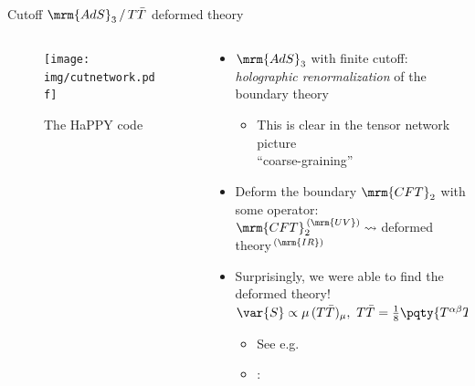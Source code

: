 \documentclass[aspectratio=169,10pt
	,noamsthm
]{beamer}
\begin{document}
\begin{frame}{Cutoff $\mrm{AdS}_3\,/\,T\bar{T}$ deformed theory}{%
	\textcite{McGough:2016lol}%
}
	\begin{columns}
	\begin{column}{.35\textwidth}
		\begin{figure}[!h]
		\centering
		\texttt{[image: img/cutnetwork.pdf]}
		\caption{The HaPPY code \cite{Pastawski:2015qua,Harlow:2018fse}}
		\end{figure}
	\end{column}
	\begin{column}{.65\textwidth}
		\begin{itemize}
		\item $\mrm{AdS}_3$ with finite cutoff:\\
		\textit{holographic renormalization} of the boundary theory
		
	\pause
		
			\begin{itemize}
			\item This is clear in the tensor network picture\\
			``coarse-graining''
			\end{itemize}
		
	\pause
		
		\item Deform the boundary $\mrm{CFT}_2$ with some operator:\\
		$\mrm{CFT}_2^{\,(\mrm{UV})} \leadsto {}$deformed theory$^{\,(\mrm{IR})}$
		
		\item Surprisingly, we were able to find the deformed theory!\\
		$
			\var{S} \propto \mu\,(T\bar{T})_\mu,\ %
			T\bar{T}
			= \frac{1}{8} \pqty{
					T^{\alpha\beta} T_{\alpha\beta}
					- (T^\alpha_\alpha)^2
				}
		$
		
			\begin{itemize}
			
			\item See e.g.~\textcite{Smirnov:2016lqw}
			
			\item \textcite{McGough:2016lol}:\\
			
			\end{itemize}
		
		\end{itemize}
	\end{column}
	\end{columns}
\end{frame}
\end{document}
